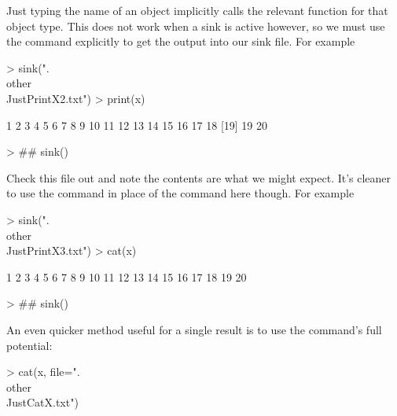 Just typing the name of an object implicitly calls the relevant  function for that object type. This does not work when a sink is active however, so we must use the  command explicitly to get the output into our sink file. For example 

\begin{Schunk}
\begin{Sinput}
> sink(".\\other\\JustPrintX2.txt")
> print(x)
\end{Sinput}
\begin{Soutput}
 [1]  1  2  3  4  5  6  7  8  9 10 11 12 13 14 15 16 17 18
[19] 19 20
\end{Soutput}
\begin{Sinput}
> ## sink()
\end{Sinput}
\end{Schunk}

Check this file out and note the contents are what we might expect. It's cleaner to use the  command in place of the  command here though. For example 

\begin{Schunk}
\begin{Sinput}
> sink(".\\other\\JustPrintX3.txt")
> cat(x)
\end{Sinput}
\begin{Soutput}
1 2 3 4 5 6 7 8 9 10 11 12 13 14 15 16 17 18 19 20
\end{Soutput}
\begin{Sinput}
> ## sink()
\end{Sinput}
\end{Schunk}

An even quicker method useful for a single result is to use the  command's full potential: 

\begin{Schunk}
\begin{Sinput}
> cat(x, file=".\\other\\JustCatX.txt") 
\end{Sinput}
\end{Schunk}

 
 
